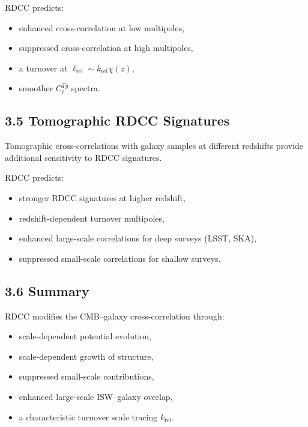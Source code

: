 \documentclass[11pt,a4paper]{article}
\begin{document}
RDCC predicts:

\begin{itemize}
    \item enhanced cross-correlation at low multipoles,
    \item suppressed cross-correlation at high multipoles,
    \item a turnover at $\ell_{\mathrm{rel}} \sim k_{\mathrm{rel}}\chi(z)$,
    \item smoother $C_{\ell}^{Tg}$ spectra.
\end{itemize}

\subsection*{3.5 Tomographic RDCC Signatures}

Tomographic cross-correlations with galaxy samples at different redshifts provide additional 
sensitivity to RDCC signatures.

RDCC predicts:

\begin{itemize}
    \item stronger RDCC signatures at higher redshift,
    \item redshift-dependent turnover multipoles,
    \item enhanced large-scale correlations for deep surveys (LSST, SKA),
    \item suppressed small-scale correlations for shallow surveys.
\end{itemize}

\subsection*{3.6 Summary}

RDCC modifies the CMB–galaxy cross-correlation through:

\begin{itemize}
    \item scale-dependent potential evolution,
    \item scale-dependent growth of structure,
    \item suppressed small-scale contributions,
    \item enhanced large-scale ISW–galaxy overlap,
    \item a characteristic turnover scale tracing $k_{\mathrm{rel}}$.
\end{itemize}
\end{document}
